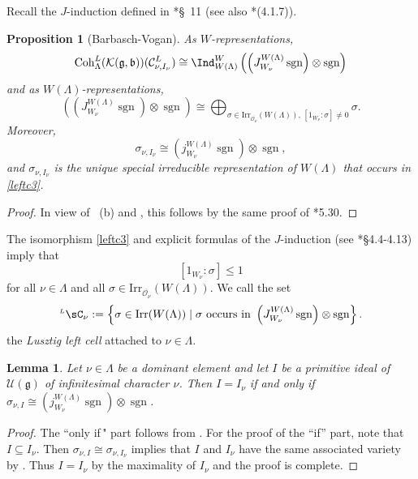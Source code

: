 \documentclass[12pt]{amsart}
\newcommand{\trivial}[2][]{\if\relax\detokenize{#1}\relax
  {%
      \color{orange} \vspace{0em}$[$#2$]$
      \color{black}
  }
  \else
\ifx#1h
\ifcsname showtrivial\endcsname
{%
    \color{orange}\vspace{0em}$[$#2$]$
    \color{black}
}
\fi
\else {\red Wrong argument!} \fi
\fi
}
\newcommand{\CC}{{\mathcal {C}}}
\newcommand{\CK}{{\mathcal {K}}}
\newcommand{\CO}{{\mathcal {O}}}
\newcommand{\CU}{{\mathcal {U}}}
\newcommand{\sgn}{\operatorname{sgn}}
\newcommand{\g}{\mathfrak g}
\renewcommand{\b}{\mathfrak b}
\newcommand{\be}{\begin {equation}}
\newcommand{\ee}{\end {equation}}
\numberwithin{equation}{section}
\newtheorem{lem}[thm]{Lemma}
\newtheorem{prop}[thm]{Proposition}
\theoremstyle{remark}
\def\Irr{\mathrm{Irr}}
\def\LC{{}^{\scriptscriptstyle L}\sC}
\def\Coh{\mathrm{Coh}}
\begin{document}
Recall the $J$-induction defined in \cite{Lcell}*{\S~11} (see also \cite{Lu}*{(4.1.7)}).
\begin{prop}[Barbasch-Vogan]\label{leftcnu}
As $W$-representations,
\[
  \Coh^L_{\Lambda}( \CK(\g,\b))(\CC^L_{ \nu, I_\nu})\cong \Ind_{W(\Lambda)}^W \left(\left(J_{W_{\nu}}^{W(\Lambda)} \sgn \right)\otimes \sgn\right)
  \]
and as $W(\Lambda)$-representations,
\begin{equation}\label{leftc3}
  \left(\left(J_{W_{\nu}}^{W(\Lambda)} \sgn \right)\otimes \sgn\right) \cong \bigoplus_{\sigma\in \Irr_{\overline{\CO_{\nu}}}(W(\Lambda)), \, [1_{W_\nu} :\sigma]\neq 0 }  \sigma.
\end{equation}
Moreover,
\[
\sigma_{\nu,I_\nu} \cong \left(j_{W_{\nu}}^{W(\Lambda)} \sgn \right)\otimes \sgn ,
\]
and $\sigma_{\nu,I_\nu}$ is the unique special irreducible representation of $W(\Lambda)$ that occurs in \eqref{leftc3}.
\end{prop}
\begin{proof}
    In view of ~(b) and , this follows by the same proof of \cite{BVUni}*{5.30}.
\end{proof}


The isomorphism \eqref{leftc3} and explicit formulas of the $J$-induction (see \cite{Lu}*{\S4.4-4.13}) imply that
\be\label{mulone}
 [1_{W_\nu} :\sigma]\leq 1
 \ee
for all $\nu\in \Lambda$ and all $ \sigma\in \Irr_{\overline{\CO_\nu}}(W(\Lambda))$.
We call the set
\begin{equation} \label{ll}
\LC_{\nu}:=\left\{\sigma\in \Irr(W(\Lambda))\mid \sigma \textrm{ occurs in } \left(J_{W_{\nu}}^{W(\Lambda)} \sgn \right)\otimes \sgn\right \}.
\end{equation}
the \emph{Lusztig left cell} attached to $\nu\in \Lambda$. %


\begin{lem}\label{leftcnu2}
Let $\nu\in \Lambda$ be a dominant element and let $I$ be a primitive ideal of $\CU(\g)$ of infinitesimal character $\nu$.    Then $I=I_\nu$ if and only if $\sigma_{\nu, I}\cong \left(j_{W_{\nu}}^{W(\Lambda)} \sgn \right)\otimes \sgn$.




\end{lem}
\begin{proof}
The ``only if$\,$" part  follows from .
For the proof of the ``if'' part, note that $I \subseteq I_\nu$.
Then $\sigma_{\nu, I}\cong \sigma_{\nu, I_\nu}$
implies that $I$ and $I_\nu$ have the same associated variety by .
Thus $I=I_\nu$ by the maximality of $I_\nu$ and the proof is complete.
\end{proof}
\end{document}
